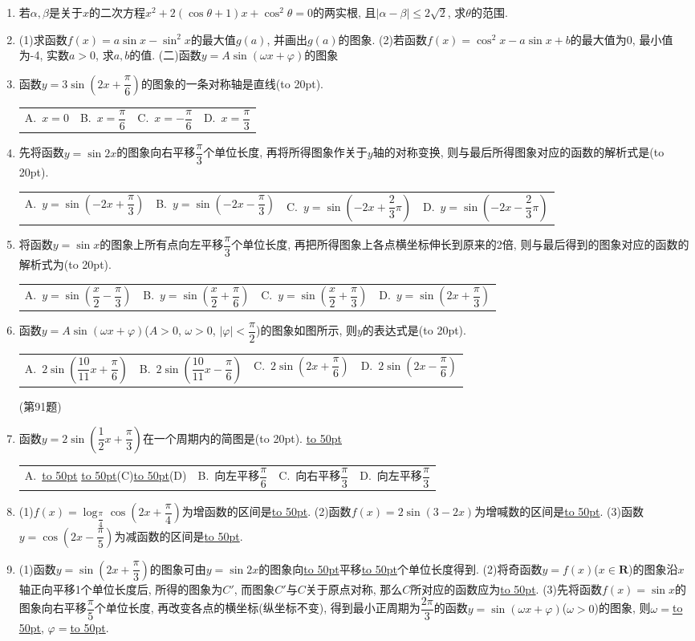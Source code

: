 \documentclass[10pt,a4paper]{article}
\newcommand{\blank}[1]{\underline{\hbox to #1pt{}}}
\newcommand{\bracket}[1]{(\hbox to #1pt{})}
\newcommand{\fourch}[4]{\par\begin{tabular}{p{.23\textwidth}p{.23\textwidth}p{.23\textwidth}p{.23\textwidth}}
A.~#1 &B.~#2& C.~#3& D.~#4
\end{tabular}}
\begin{document}
\begin{enumerate}[1.]
\item 若$\alpha ,\beta$是关于$x$的二次方程$x^2+2(\cos \theta +1)x+\cos ^2\theta =0$的两实根, 且$|\alpha -\beta|\le 2\sqrt 2$, 求$\theta$的范围.
\item (1)求函数$f(x)=a\sin x-\sin ^2x$的最大值$g(a)$, 并画出$g(a)$的图象.
(2)若函数$f(x)=\cos ^2x-a\sin x+b$的最大值为0, 最小值为-4, 实数$a>0$, 求$a,b$的值.
(二)函数$y=A\sin (\omega x+\varphi)$的图象
\item 函数$y=3\sin (2x+\dfrac{\pi }6)$的图象的一条对称轴是直线\bracket{20}.
\fourch{$x=0$}{$x=\dfrac{\pi }6$}{$x=-\dfrac{\pi }6$}{$x=\dfrac{\pi }3$}
\item 先将函数$y=\sin 2x$的图象向右平移$\dfrac{\pi }3$个单位长度, 再将所得图象作关于$y$轴的对称变换, 则与最后所得图象对应的函数的解析式是\bracket{20}.
\fourch{$y=\sin (-2x+\dfrac{\pi }3)$}{$y=\sin (-2x-\dfrac{\pi }3)$}{$y=\sin (-2x+\dfrac 23\pi)$}{$y=\sin (-2x-\dfrac 23\pi)$}
\item 将函数$y=\sin x$的图象上所有点向左平移$\dfrac{\pi }3$个单位长度, 再把所得图象上各点横坐标伸长到原来的2倍, 则与最后得到的图象对应的函数的解析式为\bracket{20}.
\fourch{$y=\sin (\dfrac x2-\dfrac{\pi }3)$}{$y=\sin (\dfrac x2+\dfrac{\pi }6)$}{$y=\sin (\dfrac x2+\dfrac{\pi }3)$}{$y=\sin (2x+\dfrac{\pi }3)$}
\item 函数$y=A\sin (\omega x+\varphi)$($A>0$, $\omega >0$, $|\varphi|<\dfrac{\pi }2$)的图象如图所示, 则$y$的表达式是\bracket{20}.
\fourch{$2\sin (\dfrac{10}{11}x+\dfrac{\pi }6)$}{$2\sin (\dfrac{10}{11}x-\dfrac{\pi }6)$}{$2\sin (2x+\dfrac{\pi }6)$}{$2\sin (2x-\dfrac{\pi }6)$}
(第91题)
\item 函数$y=2\sin (\dfrac 12x+\dfrac{\pi }3)$在一个周期内的简图是\bracket{20}.
\blank{50}\fourch{\blank{50}
\blank{50}(C)\blank{50}(D)
\item 要得到函数$y=\sin (\dfrac x2-\dfrac{\pi }6)$的图象.只需将函数$y=\sin \dfrac x2$的图象\bracket{20}.
(A)向右平移$\dfrac{\pi }6$}{向左平移$\dfrac{\pi }6$}{向右平移$\dfrac{\pi }3$}{向左平移$\dfrac{\pi }3$}
\item (1)$f(x)=\log _{\dfrac{\pi }4}\cos (2x+\dfrac{\pi }4)$为增函数的区间是\blank{50}.
(2)函数$f(x)=2\sin (3-2x)$为增喊数的区间是\blank{50}.
(3)函数$y=\cos (2x-\dfrac{\pi }5)$为减函数的区间是\blank{50}.
\item (1)函数$y=\sin (2x+\dfrac{\pi }3)$的图象可由$y=\sin 2x$的图象向\blank{50}平移\blank{50}个单位长度得到.
(2)将奇函数$y=f(x)$($x\in \mathbf{R}$)的图象沿$x$轴正向平移1个单位长度后, 所得的图象为$C'$, 而图象$C'$与$C$关于原点对称, 那么$C$所对应的函数应为\blank{50}.
(3)先将函数$f(x)=\sin x$的图象向右平移$\dfrac{\pi }5$个单位长度, 再改变各点的横坐标(纵坐标不变), 得到最小正周期为$\dfrac{2\pi }3$的函数$y=\sin (\omega x+\varphi)$($\omega >0$)的图象, 则$\omega =$\blank{50}, $\varphi =$\blank{50}.

\end{enumerate}
\end{document}
